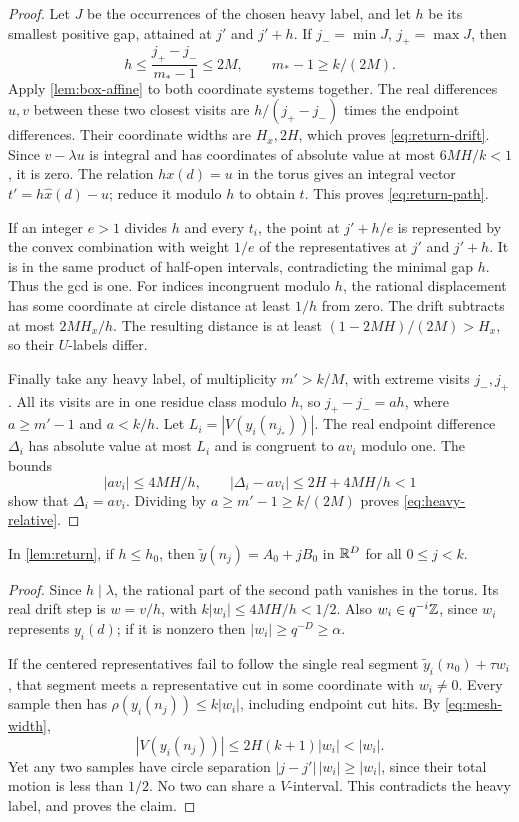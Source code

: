 \begin{proof}
Let \(J\) be the occurrences of the chosen heavy label, and let \(h\)
be its smallest positive gap, attained at \(j'\) and \(j'+h\).
If \(j_-=\min J\), \(j_+=\max J\), then
\[
 h\le\frac{j_+-j_-}{m_*-1}\le2M,\qquad
 m_*-1\ge k/(2M).
 \]
Apply \cref{lem:box-affine} to both coordinate systems together.
The real differences \(u,v\) between these two closest visits are
\(h/(j_+-j_-)\) times the endpoint differences. Their coordinate
widths are \(H_x,2H\), which proves \eqref{eq:return-drift}.
Since \(v-\lambda u\) is integral and has coordinates of absolute
value at most \(6MH/k<1\), it is zero.
The relation \(h x(d)=u\) in the torus gives an integral vector
\(t'=h\widehat{x}(d)-u\); reduce it modulo \(h\) to obtain \(t\).
This proves \eqref{eq:return-path}.

If an integer \(e>1\) divides \(h\) and every \(t_i\), the point
at \(j'+h/e\) is represented by the convex combination with weight
\(1/e\) of the representatives at \(j'\) and \(j'+h\).
It is in the same product of half-open intervals, contradicting the
minimal gap \(h\). Thus the gcd is one.
For indices incongruent modulo \(h\), the rational displacement has
some coordinate at circle distance at least \(1/h\) from zero.
The drift subtracts at most \(2MH_x/h\).
The resulting distance is at least
\((1-2MH)/(2M)>H_x\), so their \(U\)-labels differ.

Finally take any heavy label, of multiplicity \(m'>k/M\), with
extreme visits \(j_-,j_+\). All its visits are in one residue class
modulo \(h\), so \(j_+-j_-=a h\), where \(a\ge m'-1\) and \(a<k/h\).
Let \(L_i=|V(y_i(n_{j_*}))|\). The real endpoint difference
\(\Delta_i\) has absolute value at most \(L_i\) and is congruent to
\(av_i\) modulo one. The bounds
\[
 |av_i|\le4MH/h,\qquad
 |\Delta_i-av_i|\le2H+4MH/h<1
\]
show that \(\Delta_i=av_i\).
Dividing by \(a\ge m'-1\ge k/(2M)\) proves
\eqref{eq:heavy-relative}.
\end{proof}

\begin{lemma}\label{lem:short}
In \cref{lem:return}, if \(h\le h_0\), then
\(\widetilde y(n_j)=A_0+jB_0\) in \(\mathbb R^D\) for all \(0\le j<k\).
\end{lemma}

\begin{proof}
Since \(h\mid\lambda\), the rational part of the second path
vanishes in the torus. Its real drift step is \(w=v/h\), with
\(k|w_i|\le4MH/h<1/2\).
Also \(w_i\in q^{-i}\mathbb Z\), since \(w_i\) represents \(y_i(d)\);
if it is nonzero then \(|w_i|\ge q^{-D}\ge\alpha\).

If the centered representatives fail to follow the single real
segment \(\widetilde y_i(n_0)+\tau w_i\), that segment meets a
representative cut in some coordinate with \(w_i\ne0\).
Every sample then has \(\rho(y_i(n_j))\le k|w_i|\), including
endpoint cut hits. By \eqref{eq:mesh-width},
\[
 |V(y_i(n_j))|\le2H(k+1)|w_i|<|w_i|.
\]
Yet any two samples have circle separation
\(|j-j'|\,|w_i|\ge |w_i|\), since their total motion is less than
\(1/2\). No two can share a \(V\)-interval. This contradicts the
heavy label, and proves the claim.
\end{proof}
